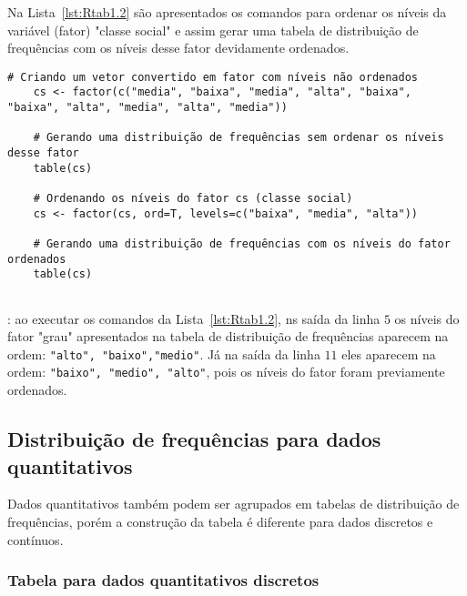 \documentclass[11pt,fleqn]{book} %
\begin{document}
Na Lista~\ref{lst:Rtab1.2} são apresentados os comandos para ordenar os níveis da variável (fator) "classe social" e assim gerar uma tabela de distribuição de frequências com os níveis desse fator devidamente ordenados. \\


\begin{scriptsize}
	\estiloR
	\begin{lstlisting}[caption={Comandos do software R}, label=lst:Rtab1.2]
	# Criando um vetor convertido em fator com níveis não ordenados
	cs <- factor(c("media", "baixa", "media", "alta", "baixa", "baixa", "alta", "media", "alta", "media"))

	# Gerando uma distribuição de frequências sem ordenar os níveis desse fator
	table(cs)	

	# Ordenando os níveis do fator cs (classe social)
	cs <- factor(cs, ord=T, levels=c("baixa", "media", "alta"))

	# Gerando uma distribuição de frequências com os níveis do fator ordenados
	table(cs)
	
	\end{lstlisting}
\end{scriptsize}

: ao executar os comandos da Lista~\ref{lst:Rtab1.2}, ns saída da linha $5$ os níveis do fator "grau" apresentados na tabela de distribuição de frequências aparecem na ordem: \texttt{"alto", "baixo","medio"}. Já na saída da linha $11$ eles aparecem na ordem: \texttt{"baixo", "medio", "alto"}, pois os níveis do fator foram previamente ordenados. \\




\subsection{Distribuição de frequências para dados quantitativos}
\vspace{0,3cm}

Dados quantitativos também podem ser agrupados em tabelas de distribuição de frequências, porém a construção da tabela é diferente para dados discretos e contínuos. \\


\subsubsection{Tabela para dados quantitativos discretos}
\vspace{0,3cm}
\end{document}
